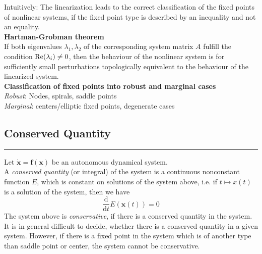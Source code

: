 Intuitively: The linearization leads to the correct classification of the fixed points of nonlinear systems, if the fixed point type is described by an inequality and not an equality.\\

\textbf{Hartman-Grobman theorem}\\
If both eigenvalues $\lambda_1, \lambda_2$ of the corresponding system matrix $A$ fulfill the condition $\textup{Re}(\lambda_i) \neq 0$, then the behaviour of the nonlinear system is for sufficiently small perturbations topologically equivalent to the behaviour of the linearized system.\\

\textbf{Classification of fixed points into robust and marginal cases}\\
\emph{Robust}: Nodes, spirals, saddle points\\
\emph{Marginal}: centers/elliptic fixed points, degenerate cases

\subsection{Conserved Quantity}
\noindent\rule[\linienAbstand]{\linewidth}{\linienDicke}
Let $\dot{\textbf{x}} = \textbf{f}(\textbf{x})$ be an autonomous dynamical system.\\
A \emph{conserved quantity} (or integral) of the system is a continuous nonconstant function $E$, which is constant on solutions of the system above, i.e. if $t \mapsto x(t)$ is a solution of the system, then we have
\begin{equation}
  \frac{\mathrm{d} }{\mathrm{d} t} E(\textbf{x}(t)) = 0
\end{equation}
The system above is \emph{conservative}, if there is a conserved quantity in the system.\\

It is in general difficult to decide, whether there is a conserved quantity in a given system.
However, if there is a fixed point in the system which is of another type than saddle point or center, the system cannot be conservative.\\

